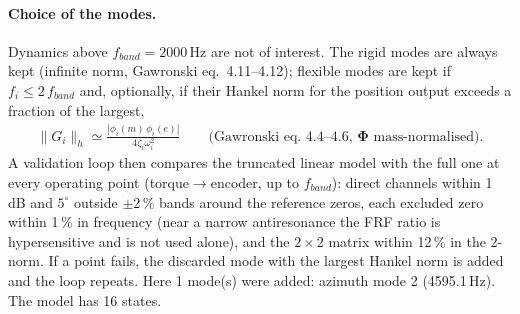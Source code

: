 \documentclass[10pt,a4paper]{article}
\numberwithin{equation}{section}
\begin{document}
\paragraph{Choice of the modes.} Dynamics above $f_{band} = 2000$\,Hz are not of interest. The rigid modes are always kept (infinite norm, Gawronski eq.~4.11--4.12); flexible modes are kept if $f_i \le 2\,f_{band}$ and, optionally, if their Hankel norm for the position output exceeds a fraction of the largest,
\begin{gather}
\|G_i\|_h \simeq \frac{|\phi_i(m)\,\phi_i(e)|}{4\zeta_i\omega_i^2}\qquad\text{(Gawronski eq.~4.4--4.6, $\boldsymbol\Phi$ mass-normalised).}
\end{gather}
A validation loop then compares the truncated linear model with the full one at every operating point (torque$\to$encoder, up to $f_{band}$): direct channels within 1\,dB and $5^\circ$ outside $\pm2\,\%$ bands around the reference zeros, each excluded zero within 1\,\% in frequency (near a narrow antiresonance the FRF ratio is hypersensitive and is not used alone), and the $2\times2$ matrix within 12\,\% in the 2-norm. If a point fails, the discarded mode with the largest Hankel norm is added and the loop repeats. Here 1 mode(s) were added: azimuth mode 2 (4595.1\,Hz). The model has 16 states.
\end{document}

